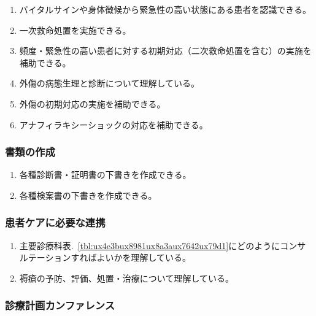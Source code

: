 \documentclass[
]{ltjsarticle}
\providecommand{\tightlist}{%
  \setlength{\itemsep}{0pt}\setlength{\parskip}{0pt}}
\begin{document}
\begin{enumerate}
\def\labelenumi{\arabic{enumi}.}
\tightlist
\item
  バイタルサインや身体徴候から緊急性の高い状態にある患者を認識できる。
\item
  一次救命処置を実施できる。
\item
  頻度・緊急性の高い患者に対する初期対応（二次救命処置を含む）の実施を補助できる。
\item
  外傷の病態生理と診断について理解している。
\item
  外傷の初期対応の実施を補助できる。
\item
  アナフィラキシーショックの対応を補助できる。
\end{enumerate}

\hypertarget{ux66f8ux985eux306eux4f5cux6210}{%
\subsubsection{書類の作成}\label{ux66f8ux985eux306eux4f5cux6210}}

\begin{enumerate}
\def\labelenumi{\arabic{enumi}.}
\tightlist
\item
  各種診断書・証明書の下書きを作成できる。
\item
  各種検案書の下書きを作成できる。
\end{enumerate}

\hypertarget{ux60a3ux8005ux30b1ux30a2ux306bux5fc5ux8981ux306aux9023ux643a}{%
\subsubsection{患者ケアに必要な連携}\label{ux60a3ux8005ux30b1ux30a2ux306bux5fc5ux8981ux306aux9023ux643a}}

\begin{enumerate}
\def\labelenumi{\arabic{enumi}.}
\tightlist
\item
  主要診療科表.~\ref{tbl:ux4e3bux8981ux8a3aux7642ux79d1}にどのようにコンサルテーションすればよいかを理解している。
\item
  褥瘡の予防、評価、処置・治療について理解している。
\end{enumerate}

\hypertarget{ux8a3aux7642ux8a08ux753bux30abux30f3ux30d5ux30a1ux30ecux30f3ux30b9}{%
\subsubsection{診療計画カンファレンス}\label{ux8a3aux7642ux8a08ux753bux30abux30f3ux30d5ux30a1ux30ecux30f3ux30b9}}
\end{document}
